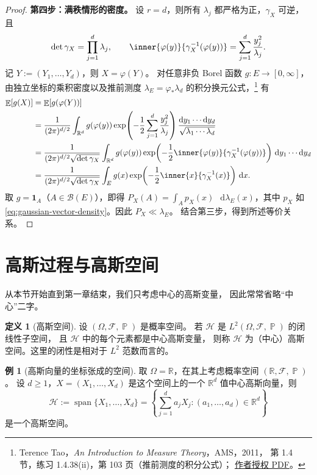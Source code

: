 \documentclass[UTF8,11pt,a4paper,oneside,fontset=fandol]{ctexrep}
\numberwithin{equation}{section}
\theoremstyle{plain}
\theoremstyle{definition}
\newtheorem{definition}[theorem]{定义}
\newtheorem{example}[theorem]{例}
\theoremstyle{remark}
\newcommand{\R}{\mathbb{R}}
\newcommand{\B}{\mathcal{B}}
\newcommand{\F}{\mathcal{F}}
\newcommand{\Hcal}{\mathcal{H}}
\DeclareMathOperator{\Prob}{\mathbb{P}}
\DeclareMathOperator{\E}{\mathbb{E}}
\newcommand{\ind}[1]{\mathbf{1}_{#1}}
\newcommand{\dd}{\mathop{}\!\mathrm{d}}
\begin{document}
\begin{proof}
\textbf{第四步：满秩情形的密度。}
设 $r=d$，则所有 $\lambda_j$ 都严格为正，$\gamma_X$ 可逆，且
\[
  \det\gamma_X=\prod_{j=1}^{d}\lambda_j,
  \qquad
  \inner{\varphi(y)}{\gamma_X^{-1}(\varphi(y))}
  =\sum_{j=1}^{d}\frac{y_j^2}{\lambda_j}.
\]
记 $Y:=(Y_1,\ldots,Y_d)$，则 $X=\varphi(Y)$。
对任意非负 Borel 函数 $g:E\to[0,\infty]$，
由独立坐标的乘积密度以及推前测度 $\lambda_E=\varphi_*\lambda_d$ 的积分换元公式，\footnote{%
Terence Tao，\emph{An Introduction to Measure Theory}，AMS，2011，
第 1.4 节，练习 1.4.38(ii)，第 103 页（推前测度的积分公式）；
\href{https://terrytao.wordpress.com/wp-content/uploads/2012/12/gsm-126-tao5-measure-book.pdf}{作者授权 PDF}。}
有
\begin{align*}
  \E[g(X)]
  &=\E[g(\varphi(Y))]\\
  &=\frac{1}{(2\pi)^{d/2}}
    \int_{\R^d}g(\varphi(y))
      \exp\!\left(-\frac12\sum_{j=1}^{d}\frac{y_j^2}{\lambda_j}\right)
      \frac{\dd y_1\cdots\dd y_d}{\sqrt{\lambda_1\cdots\lambda_d}}\\
  &=\frac{1}{(2\pi)^{d/2}\sqrt{\det\gamma_X}}
    \int_{\R^d}g(\varphi(y))
      \exp\!\left(
        -\frac12\inner{\varphi(y)}{\gamma_X^{-1}(\varphi(y))}
      \right)\,\dd y_1\cdots\dd y_d\\
  &=\frac{1}{(2\pi)^{d/2}\sqrt{\det\gamma_X}}
    \int_E g(x)
      \exp\!\left(-\frac12\inner{x}{\gamma_X^{-1}(x)}\right)\,\dd x.
\end{align*}
取 $g=\ind{A}$（$A\in\B(E)$），即得
$P_X(A)=\int_A p_X(x)\,\dd\lambda_E(x)$，其中 $p_X$ 如
\cref{eq:gaussian-vector-density}。因此 $P_X\ll\lambda_E$。
结合第三步，得到所述等价关系。
\end{proof}

\section{高斯过程与高斯空间}
\label{sec:gaussian-processes-spaces}

从本节开始直到第一章结束，我们只考虑中心的高斯变量，
因此常常省略“中心”二字。
\begin{definition}[高斯空间]
\label{def:gaussian-space}
设 $(\Omega,\F,\Prob)$ 是概率空间。
若 $\Hcal$ 是 $L^2(\Omega,\F,\Prob)$ 的闭线性子空间，
且 $\Hcal$ 中的每个元素都是中心高斯变量，
则称 $\Hcal$ 为（中心）高斯空间。这里的闭性是相对于 $L^2$ 范数而言的。
\end{definition}

\begin{example}[高斯向量的坐标张成的空间]
\label{ex:gaussian-coordinate-span}
取 $\Omega=\R$，在其上考虑概率空间 $(\R,\F,\Prob)$。
设 $d\ge1$，$X=(X_1,\ldots,X_d)$ 是这个空间上的一个
$\R^d$ 值中心高斯向量，则
\[
  \Hcal:=\operatorname{span}\{X_1,\ldots,X_d\}
  =\left\{\sum_{j=1}^{d}a_jX_j:(a_1,\ldots,a_d)\in\R^d\right\}
\]
是一个高斯空间。
\end{example}
\end{document}
